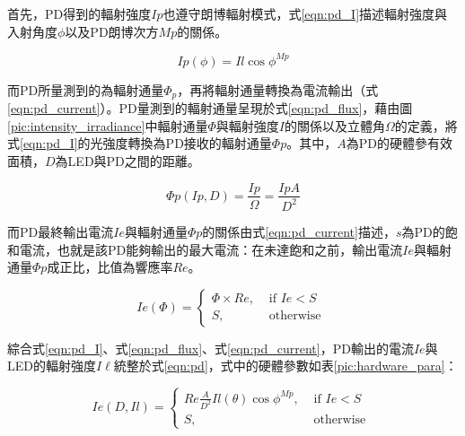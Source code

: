                 首先，PD得到的輻射強度$Ip$也遵守朗博輻射模式，式\ref{eqn:pd_I}描述輻射強度與入射角度$\phi$以及PD朗博次方$Mp$的關係。

                \begin{equation}
                    \label{eqn:pd_I}
                    Ip(\phi) = Il \cos \phi^{Mp}
                \end{equation}

                \qquad
                而PD所量測到的為輻射通量$\Phi_p$，再將輻射通量轉換為電流輸出（式\ref{eqn:pd_current}）。PD量測到的輻射通量呈現於式\ref{eqn:pd_flux}，藉由圖\ref{pic:intensity_irradiance}中輻射通量$\Phi$與輻射強度$I$的關係以及立體角$\Omega$的定義，將式\ref{eqn:pd_I}的光強度轉換為PD接收的輻射通量$\Phi p$。其中，$A$為PD的硬體參有效面積，$D$為LED與PD之間的距離。

                \begin{equation}
                    \label{eqn:pd_flux}
                    \Phi p(Ip,D) = \frac{Ip}{\Omega} = \frac{IpA}{D^2}
                \end{equation}

                而PD最終輸出電流$Ie$與輻射通量$\Phi p$的關係由式\ref{eqn:pd_current}描述，$s$為PD的飽和電流，也就是該PD能夠輸出的最大電流：在未達飽和之前，輸出電流$Ie$與輻射通量$\Phi p$成正比，比值為響應率$Re$。

                \begin{equation}
                    \label{eqn:pd_current}
                    Ie(\Phi) = \begin{cases}\Phi\times Re, & \text { if } Ie<S \\ S, & \text { otherwise }\end{cases}
                \end{equation}

                綜合式\ref{eqn:pd_I}、式\ref{eqn:pd_flux}、式\ref{eqn:pd_current}，PD輸出的電流$Ie$與LED的輻射強度$I\ell$統整於式\ref{eqn:pd}，式中的硬體參數如表\ref{pic:hardware_para}：

                \begin{equation}
                    \label{eqn:pd}
                    Ie(D,Il) = \begin{cases}Re \frac{A}{D^2}Il(\theta) \cos \phi^{Mp}, & \text { if } Ie<S \\ S, & \text { otherwise }\end{cases}
                \end{equation}
         

